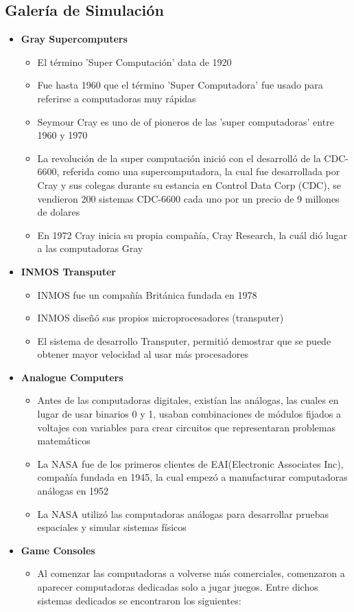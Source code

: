 \documentclass{report}
\begin{document}
\begin{enumerate}
\subsection*{Galería de Simulación}
	\begin{itemize}
		\item \textbf{Gray Supercomputers}
			\begin{itemize}
				\item El término 'Super Computación' data de 1920
				\item Fue hasta 1960 que el término 'Super Computadora' fue usado para referirse a computadoras muy rápidas
				\item Seymour Cray es uno de of pioneros de las 'super computadoras' entre 1960 y 1970
				\item La revolución de la super computación inició con el desarrolló de la CDC-6600, referida como una supercomputadora, la cual fue desarrollada por Cray y sus colegas durante su estancia en Control Data Corp (CDC), se vendieron 200 sistemas CDC-6600 cada uno por un precio de 9 millones de dolares
				\item En 1972 Cray inicia su propia compañía, Cray Research, la cuál dió lugar a las computadoras Gray
			\end{itemize}
		\item \textbf{INMOS Transputer}
			\begin{itemize}
				\item INMOS fue un compañía Británica fundada en 1978 
				\item INMOS diseñó sus propios microprocesadores (transputer)
				\item El sistema de desarrollo Transputer, permitió demostrar que se puede obtener mayor velocidad al usar más procesadores
			\end{itemize}
		\item \textbf{Analogue Computers}
			\begin{itemize}
				\item Antes de las computadoras digitales, existían las análogas, las cuales en lugar de usar binarios 0 y 1, usaban combinaciones de módulos fijados a voltajes con variables para crear circuitos que representaran problemas matemáticos
				\item La NASA fue de los primeros clientes de EAI(Electronic Associates Inc), compañía fundada en 1945, la cual empezó a manufacturar computadoras análogas en 1952
				\item La NASA utilizó las computadoras análogas para desarrollar pruebas espaciales y simular sistemas físicos
			\end{itemize}
		\item \textbf{Game Consoles}
			\begin{itemize}
				\item Al comenzar las computadoras a volverse más comerciales, comenzaron a aparecer computadoras dedicadas solo a jugar juegos. Entre dichos sistemas dedicados se encontraron los siguientes:
					\begin{itemize}
							

\end{itemize}
\end{itemize}
\end{itemize}
\end{enumerate}
\end{document}

